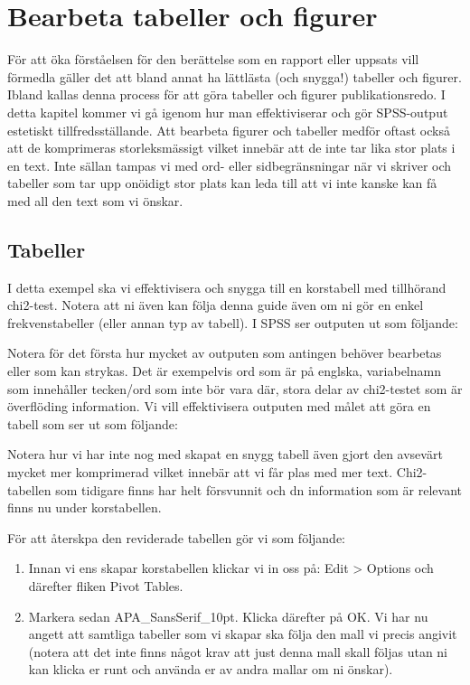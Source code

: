\documentclass[
]{book}
\begin{document}
\hypertarget{bearbeta-tabeller-och-figurer}{%
\chapter{Bearbeta tabeller och figurer}\label{bearbeta-tabeller-och-figurer}}

För att öka förståelsen för den berättelse som en rapport eller uppsats vill förmedla gäller det att bland annat ha lättlästa (och snygga!) tabeller och figurer. Ibland kallas denna process för att göra tabeller och figurer publikationsredo. I detta kapitel kommer vi gå igenom hur man effektiviserar och gör SPSS-output estetiskt tillfredsställande. Att bearbeta figurer och tabeller medför oftast också att de komprimeras storleksmässigt vilket innebär att de inte tar lika stor plats i en text. Inte sällan tampas vi med ord- eller sidbegränsningar när vi skriver och tabeller som tar upp onöidigt stor plats kan leda till att vi inte kanske kan få med all den text som vi önskar.

\hypertarget{tabeller}{%
\section{Tabeller}\label{tabeller}}

I detta exempel ska vi effektivisera och snygga till en korstabell med tillhörand chi2-test. Notera att ni även kan följa denna guide även om ni gör en enkel frekvenstabeller (eller annan typ av tabell). I SPSS ser outputen ut som följande:

Notera för det första hur mycket av outputen som antingen behöver bearbetas eller som kan strykas. Det är exempelvis ord som är på englska, variabelnamn som innehåller tecken/ord som inte bör vara där, stora delar av chi2-testet som är överflöding information. Vi vill effektivisera outputen med målet att göra en tabell som ser ut som följande:

Notera hur vi har inte nog med skapat en snygg tabell även gjort den avsevärt mycket mer komprimerad vilket innebär att vi får plas med mer text. Chi2-tabellen som tidigare finns har helt försvunnit och dn information som är relevant finns nu under korstabellen.

För att återskpa den reviderade tabellen gör vi som följande:

\begin{enumerate}
\def\labelenumi{\arabic{enumi}.}
\item
  Innan vi ens skapar korstabellen klickar vi in oss på: Edit \textgreater{} Options och därefter fliken Pivot Tables.
\item
  Markera sedan APA\_SansSerif\_10pt. Klicka därefter på OK. Vi har nu angett att samtliga tabeller som vi skapar ska följa den mall vi precis angivit (notera att det inte finns något krav att just denna mall skall följas utan ni kan klicka er runt och använda er av andra mallar om ni önskar).
\end{enumerate}
\end{document}
